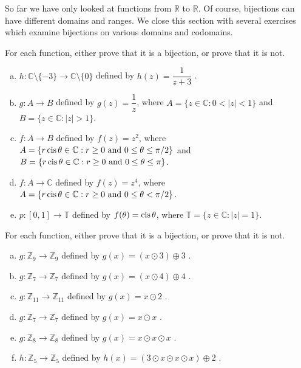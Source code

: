  
So far we have only looked at functions from $\mathbb{R}$ to $\mathbb{R}$.  Of course, bijections can have different domains and ranges. We close this section with several exercises which examine bijections on 
various domains and  codomains.

\begin{exercise}{} 
For each function, either prove that it is a bijection, or prove that it is not.
\begin{enumerate}[(a)]
\item
 $h \colon {\mathbb C}\setminus \{-3\}  \to {\mathbb C}\setminus \{0\} $ defined by $h(z) =  \dfrac{1}{z+3}$ .
\item
 $g \colon A   \to B $ defined by $g(z) =  \dfrac{1}{z}$, where $A =  \{z \in \mathbb{C}: 0<|z|<1\}$ and $B =  \{z \in \mathbb{C}: |z|>1\}$.
\item
 $f \colon A   \to B $ defined by $f(z) =  z^2$, where $A =  \{ r \operatorname{cis} \theta \in \mathbb{C}: r \ge 0 \text{ and } 0 \le \theta \le \pi/2 \}$ and 
$B =  \{ r \operatorname{cis} \theta \in \mathbb{C}: r \ge 0 \text{ and } 0 \le \theta \le \pi \}$.
\item
 $f \colon A   \to \mathbb{C} $ defined by $f(z) =  z^4$, where $A =  \{ r \operatorname{cis} \theta \in \mathbb{C}: r \ge 0 \text{ and } 0 \le \theta < \pi/2 \}$.
\item
 $p \colon [0,1]   \to \mathbb{T} $ defined by $f(\theta) =  \operatorname{cis} \theta$, where $\mathbb{T} =  \{ z \in \mathbb{C}: |z|=1 \}$.
 \end{enumerate}
\end{exercise}


\begin{exercise}{} 
For each function, either prove that it is a bijection, or prove that it is not.
\begin{enumerate}[(a)]
\item \label{modular9}
 $g \colon {\mathbb Z}_9 \to {\mathbb Z}_9$ defined by $g(x)= (x \odot 3) \oplus 3$ .
\item \label{modular_m6}
 $g \colon {\mathbb Z}_7 \to {\mathbb Z}_7$ defined by $g(x) = (x \odot 4) \oplus 4 $ .
\item \label{modular_m7}
 $g \colon {\mathbb Z}_{11} \to {\mathbb Z}_{11}$ defined by $g(x) =  x \odot 2$ .
\item 
 $g \colon {\mathbb Z}_7 \to {\mathbb Z}_7$ defined by $g(x)= x \odot x$ .
\item 
 $g \colon {\mathbb Z}_8 \to {\mathbb Z}_8$ defined by $g(x)= x \odot x \odot x$ .
\item 
 $h \colon {\mathbb Z}_5 \to {\mathbb Z}_5$ defined by $h(x)= (3 \odot x \odot x \odot x) \oplus 2$ .
 \end{enumerate}
\end{exercise}


